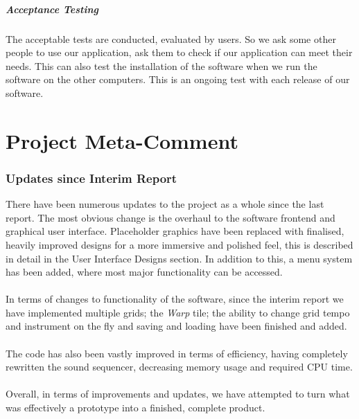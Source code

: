 \documentclass[10pt,a4paper]{article}
\begin{document}
\subsubsection{Acceptance Testing}
The acceptable tests are conducted, evaluated by users. So we ask some other people to use our application, ask them to check if our application can meet their needs. This can also test the installation of the software when we run the software on the other computers. This is an ongoing test with each release of our software.

\part{Project Meta-Comment}
\section{Updates since Interim Report}
There have been numerous updates to the project as a whole since the last report. The most obvious change is the overhaul to the software frontend and graphical user interface. Placeholder graphics have been replaced with finalised, heavily improved designs for a more immersive and polished feel, this is described in detail in the User Interface Designs section. In addition to this, a menu system has been added, where most major functionality can be accessed. \\
\\
In terms of changes to functionality of the software, since the interim report we have implemented multiple grids; the \textit{Warp} tile; the ability to change grid tempo and instrument on the fly and saving and loading have been finished and added.\\
\\
The code has also been vastly improved in terms of efficiency, having completely rewritten the sound sequencer, decreasing memory usage and required CPU time.\\
\\
Overall, in terms of improvements and updates, we have attempted to turn what was effectively a prototype into a finished, complete product.\\
\end{document}
